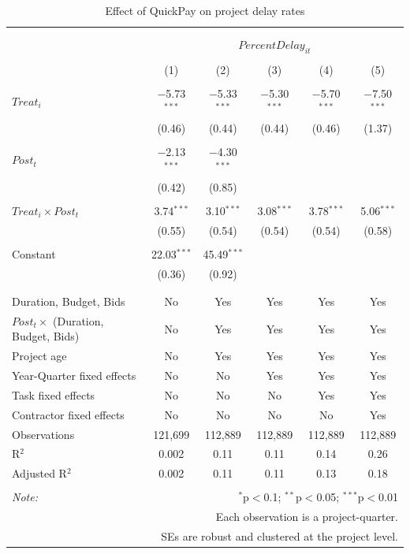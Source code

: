 \documentclass[
]{article}
\begin{document}
\begin{table}[H] \centering 
  \caption{Effect of QuickPay on project delay rates} 
  \label{} 
\small 
\begin{tabular}{@{\extracolsep{-2pt}}lccccc} 
\\[-1.8ex]\hline 
\hline \\[-1.8ex] 
\\[-1.8ex] & \multicolumn{5}{c}{$PercentDelay_{it}$} \\ 
\\[-1.8ex] & (1) & (2) & (3) & (4) & (5)\\ 
\hline \\[-1.8ex] 
 $Treat_i$ & $-$5.73$^{***}$ & $-$5.33$^{***}$ & $-$5.30$^{***}$ & $-$5.70$^{***}$ & $-$7.50$^{***}$ \\ 
  & (0.46) & (0.44) & (0.44) & (0.46) & (1.37) \\ 
  & & & & & \\ 
 $Post_t$ & $-$2.13$^{***}$ & $-$4.30$^{***}$ &  &  &  \\ 
  & (0.42) & (0.85) &  &  &  \\ 
  & & & & & \\ 
 $Treat_i \times Post_t$ & 3.74$^{***}$ & 3.10$^{***}$ & 3.08$^{***}$ & 3.78$^{***}$ & 5.06$^{***}$ \\ 
  & (0.55) & (0.54) & (0.54) & (0.54) & (0.58) \\ 
  & & & & & \\ 
 Constant & 22.03$^{***}$ & 45.49$^{***}$ &  &  &  \\ 
  & (0.36) & (0.92) &  &  &  \\ 
  & & & & & \\ 
\hline \\[-1.8ex] 
Duration, Budget, Bids & No & Yes & Yes & Yes & Yes \\ 
$Post_t \times$  (Duration, Budget, Bids) & No & Yes & Yes & Yes & Yes \\ 
Project age & No & Yes & Yes & Yes & Yes \\ 
Year-Quarter fixed effects & No & No & Yes & Yes & Yes \\ 
Task fixed effects & No & No & No & Yes & Yes \\ 
Contractor fixed effects & No & No & No & No & Yes \\ 
Observations & 121,699 & 112,889 & 112,889 & 112,889 & 112,889 \\ 
R$^{2}$ & 0.002 & 0.11 & 0.11 & 0.14 & 0.26 \\ 
Adjusted R$^{2}$ & 0.002 & 0.11 & 0.11 & 0.13 & 0.18 \\ 
\hline 
\hline \\[-1.8ex] 
\textit{Note:}  & \multicolumn{5}{r}{$^{*}$p$<$0.1; $^{**}$p$<$0.05; $^{***}$p$<$0.01} \\ 
 & \multicolumn{5}{r}{Each observation is a project-quarter.} \\ 
 & \multicolumn{5}{r}{SEs are robust and clustered at the project level.} \\ 
\end{tabular} 
\end{table}
\end{document}
